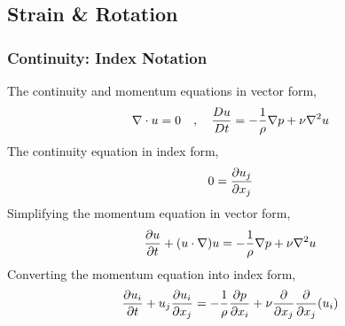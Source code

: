 \documentclass[class=report, 12pt, crop=false]{standalone}
\begin{document}
\begin{center}
\subsection{Strain \& Rotation}
\begin{comment}
\end{comment}
\subsubsection{Continuity: Index Notation}
\begin{comment}
\end{comment}
The continuity and momentum equations in vector form,
$$\nabla\cdot u=0 \quad,\quad \frac{Du}{Dt} = -\frac{1}{\rho}\nabla p + \nu\nabla^2 u$$
The continuity equation in index form,
$$0 = \frac{\partial u_j}{\partial x_j}$$
Simplifying the momentum equation in vector form,
$$\frac{\partial u}{\partial t} + (u\cdot\nabla)u = -\frac{1}{\rho}\nabla p + \nu\nabla^2 u$$
Converting the momentum equation into index form,
$$\frac{\partial u_i}{\partial t} + u_j\frac{\partial u_i}{\partial x_j} = -\frac{1}{\rho}\frac{\partial p}{\partial x_i} + \nu\frac{\partial}{\partial x_j}\frac{\partial}{\partial x_j}(u_i)$$

\end{center}
\end{document}
